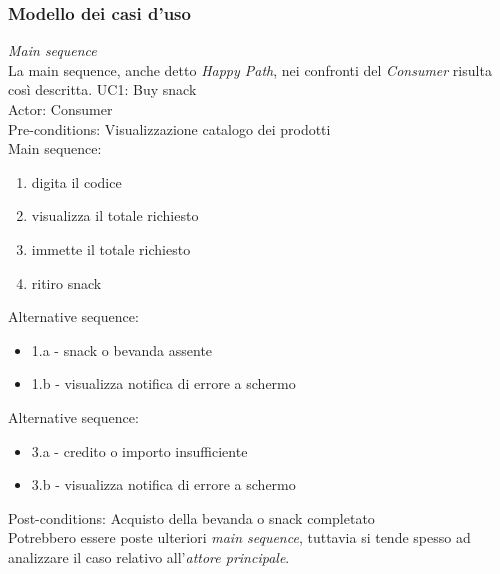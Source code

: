 \documentclass{article}
\begin{document}
\subsubsection*{Modello dei casi d'uso}
\large
\textit{Main sequence}\\ La main sequence, anche detto \textit{Happy Path}, nei confronti del \textit{Consumer} risulta così descritta.\vspace{14pt}
UC1: Buy snack\\
Actor: Consumer\\
Pre-conditions: Visualizzazione catalogo dei prodotti\\
Main sequence:
\begin{enumerate}[label={\arabic* -}, leftmargin=3.65cm]
    \itemsep0em
    \item digita il codice
    \item visualizza il totale richiesto
    \item immette il totale richiesto
    \item ritiro snack
\end{enumerate}
Alternative sequence:
\begin{itemize}[label={ },leftmargin=3.02cm]
    \itemsep0em
    \item 1.a - snack o bevanda assente
    \item 1.b - visualizza notifica di errore a schermo
\end{itemize}
Alternative sequence: 
\begin{itemize}[label={ }, leftmargin=3.02cm]
    \itemsep0em
    \item 3.a - credito o importo insufficiente
    \item 3.b - visualizza notifica di errore a schermo
\end{itemize}
Post-conditions: Acquisto della bevanda o snack completato\vspace{14pt}\\
Potrebbero essere poste ulteriori \textit{main sequence}, tuttavia si tende spesso ad analizzare il caso relativo all'\textit{attore principale}.
\end{document}
